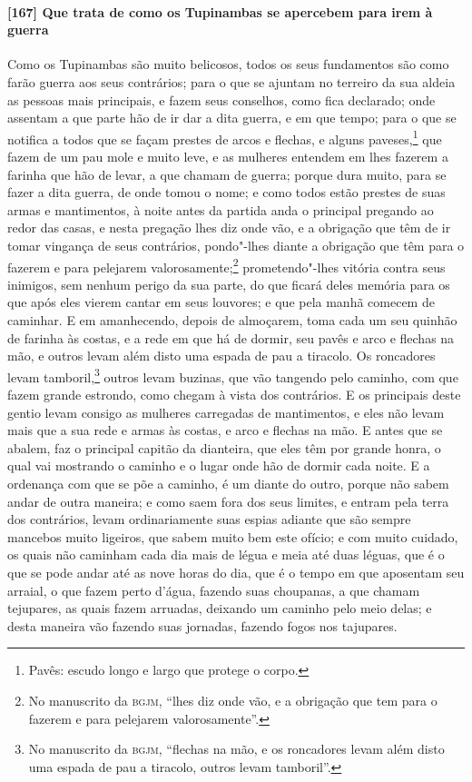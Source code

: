 \paragraph{[167] Que trata de como os Tupinambas se apercebem para irem à guerra}\quad
Como os Tupinambas são muito belicosos, todos os seus fundamentos são como farão guerra
aos seus contrários; para o que se ajuntam no terreiro da sua aldeia as pessoas mais
principais, e fazem seus conselhos, como fica declarado; onde assentam a que parte hão de
ir dar a dita guerra, e em que tempo; para o que se notifica a todos que se façam prestes
de arcos e flechas, e alguns paveses,\footnote{ Pavês: escudo longo e largo que protege o
corpo.} que fazem de um pau mole e muito leve, e as mulheres entendem em lhes fazerem a
farinha que hão de levar, a que chamam de guerra; porque dura muito, para se fazer a dita
guerra, de onde tomou o nome; e como todos estão prestes de suas armas e mantimentos, à
noite antes da partida anda o principal pregando ao redor das casas, e nesta pregação lhes
diz onde vão, e a obrigação que têm de ir tomar vingança de seus contrários, pondo"-lhes
diante a obrigação que têm para o fazerem e para pelejarem valorosamente;\footnote{ No
manuscrito da \textsc{bgjm}, ``lhes diz onde vão, e a obrigação que tem para o fazerem e
para pelejarem valorosamente''.} prometendo"-lhes vitória contra seus inimigos, sem nenhum
perigo da sua parte, do que ficará deles memória para os que após eles vierem cantar em
seus louvores; e que pela manhã comecem de caminhar. E em amanhecendo, depois de
almoçarem, toma cada um seu quinhão de farinha às costas, e a rede em que há de dormir,
seu pavês e arco e flechas na mão, e outros levam além disto uma espada de pau a tiracolo.
Os roncadores levam tamboril,\footnote{ No manuscrito da \textsc{bgjm}, ``flechas na mão,
e os roncadores levam além disto uma espada de pau a tiracolo, outros levam tamboril''.}
outros levam buzinas, que vão tangendo pelo caminho, com que fazem grande estrondo, como
chegam à vista dos contrários. E os principais deste gentio levam consigo as mulheres
carregadas de mantimentos, e eles não levam mais que a sua rede e armas às costas, e arco
e flechas na mão. E antes que se abalem, faz o principal capitão da dianteira, que eles
têm por grande honra, o qual vai mostrando o caminho e o lugar onde hão de dormir cada
noite. E a ordenança com que se põe a caminho, é um diante do outro, porque não sabem
andar de outra maneira; e como saem fora dos seus limites, e entram pela terra dos
contrários, levam ordinariamente suas espias adiante que são sempre mancebos muito
ligeiros, que sabem muito bem este ofício; e com muito cuidado, os quais não caminham cada
dia mais de légua e meia até duas léguas, que é o que se pode andar até as nove horas do
dia, que é o tempo em que aposentam seu arraial, o que fazem perto d'água, fazendo suas
choupanas, a que chamam tejupares, as quais fazem arruadas, deixando um caminho pelo meio
delas; e desta maneira vão fazendo suas jornadas, fazendo fogos nos tajupares.

